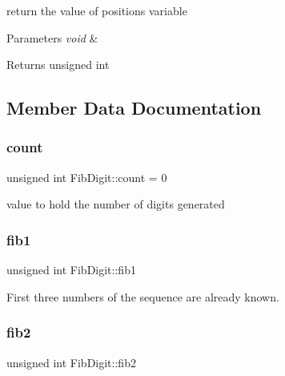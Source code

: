 return the value of positions variable 


\begin{DoxyParams}{Parameters}
{\em void} & \\
\hline
\end{DoxyParams}
\begin{DoxyReturn}{Returns}
unsigned int 
\end{DoxyReturn}


\subsection{Member Data Documentation}
\mbox{\label{classFibDigit_a4d440bf0f330acbe91cb92fa458b0876}} 
\subsubsection{\texorpdfstring{count}{count}}
{\footnotesize\ttfamily unsigned int Fib\+Digit\+::count = 0\hspace{0.3cm}{\ttfamily [protected]}}



value to hold the number of digits generated 

\mbox{\label{classFibDigit_ab21b28fe63f8cc828d1147539c08f75b}} 
\subsubsection{\texorpdfstring{fib1}{fib1}}
{\footnotesize\ttfamily unsigned int Fib\+Digit\+::fib1\hspace{0.3cm}{\ttfamily [private]}}



First three numbers of the sequence are already known. 

\mbox{\label{classFibDigit_ad8d4f9cf0ceaea45d844f719c95762d2}} 
\subsubsection{\texorpdfstring{fib2}{fib2}}
{\footnotesize\ttfamily unsigned int Fib\+Digit\+::fib2\hspace{0.3cm}{\ttfamily [private]}}

